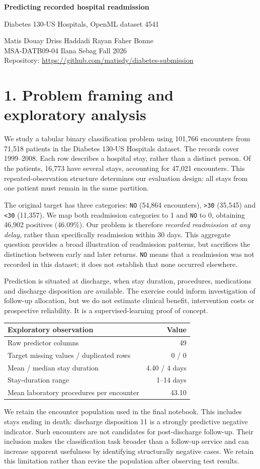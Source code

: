 \documentclass[11pt,a4paper]{article}
\newcommand{\pageheading}[2]{\section*{\color{ink}#1. #2}}
\begin{document}
{\LARGE\bfseries\color{ink} Predicting recorded hospital readmission}\par
{\large Diabetes 130-US Hospitals, OpenML dataset 4541}\par
Matis Douay \quad Driss Haddadi \quad Rayan Faher Bonne\\
MSA-DATB09-04 \quad Ilana Sebag \quad Fall 2026\\
Repository: \url{https://github.com/matisdy/diabetes-submission}

\pageheading{1}{Problem framing and exploratory analysis}
We study a tabular binary classification problem using 101,766 encounters from 71,518 patients in the Diabetes 130-US Hospitals dataset. The records cover 1999--2008. Each row describes a hospital stay, rather than a distinct person. Of the patients, 16,773 have several stays, accounting for 47,021 encounters. This repeated-observation structure determines our evaluation design: all stays from one patient must remain in the same partition.

The original target has three categories: \texttt{NO} (54,864 encounters), \texttt{>30} (35,545) and \texttt{<30} (11,357). We map both readmission categories to 1 and \texttt{NO} to 0, obtaining 46,902 positives (46.09\%). Our problem is therefore \emph{recorded readmission at any delay}, rather than specifically readmission within 30 days. This aggregate question provides a broad illustration of readmission patterns, but sacrifices the distinction between early and later returns. \texttt{NO} means that a readmission was not recorded in this dataset; it does not establish that none occurred elsewhere.

Prediction is situated at discharge, when stay duration, procedures, medications and discharge disposition are available. The exercise could inform investigation of follow-up allocation, but we do not estimate clinical benefit, intervention costs or prospective reliability. It is a supervised-learning proof of concept.

\begin{center}\begin{tabular}{lr}\toprule
Exploratory observation & Value\\\midrule
Raw predictor columns & 49\\
Target missing values / duplicated rows & 0 / 0\\
Mean / median stay duration & 4.40 / 4 days\\
Stay-duration range & 1--14 days\\
Mean laboratory procedures per encounter & 43.10\\\bottomrule
\end{tabular}\end{center}
We retain the encounter population used in the final notebook. This includes stays ending in death: discharge disposition 11 is a strongly predictive negative indicator. Such encounters are not candidates for post-discharge follow-up. Their inclusion makes the classification task broader than a follow-up service and can increase apparent usefulness by identifying structurally negative cases. We retain this limitation rather than revise the population after observing test results.
\end{document}
